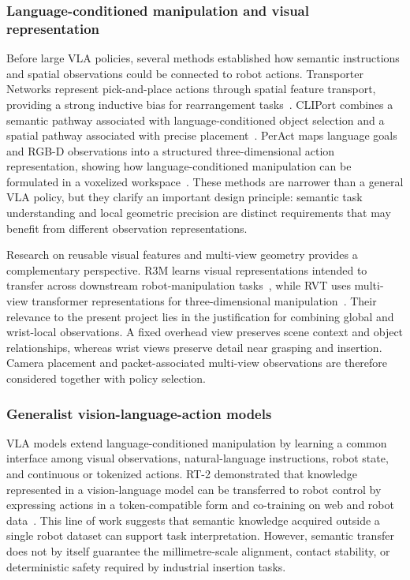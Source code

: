 \subsubsection{Language-conditioned manipulation and visual representation}

Before large VLA policies, several methods established how semantic instructions and spatial observations could be connected to robot actions. Transporter Networks represent pick-and-place actions through spatial feature transport, providing a strong inductive bias for rearrangement tasks~\cite{transporter}. CLIPort combines a semantic pathway associated with language-conditioned object selection and a spatial pathway associated with precise placement~\cite{cliport}. PerAct maps language goals and RGB-D observations into a structured three-dimensional action representation, showing how language-conditioned manipulation can be formulated in a voxelized workspace~\cite{peract}. These methods are narrower than a general VLA policy, but they clarify an important design principle: semantic task understanding and local geometric precision are distinct requirements that may benefit from different observation representations.

Research on reusable visual features and multi-view geometry provides a complementary perspective. R3M learns visual representations intended to transfer across downstream robot-manipulation tasks~\cite{r3m}, while RVT uses multi-view transformer representations for three-dimensional manipulation~\cite{rvt}. Their relevance to the present project lies in the justification for combining global and wrist-local observations. A fixed overhead view preserves scene context and object relationships, whereas wrist views preserve detail near grasping and insertion. Camera placement and packet-associated multi-view observations are therefore considered together with policy selection.

\subsubsection{Generalist vision-language-action models}

VLA models extend language-conditioned manipulation by learning a common interface among visual observations, natural-language instructions, robot state, and continuous or tokenized actions. RT-2 demonstrated that knowledge represented in a vision-language model can be transferred to robot control by expressing actions in a token-compatible form and co-training on web and robot data~\cite{rt2}. This line of work suggests that semantic knowledge acquired outside a single robot dataset can support task interpretation. However, semantic transfer does not by itself guarantee the millimetre-scale alignment, contact stability, or deterministic safety required by industrial insertion tasks.

